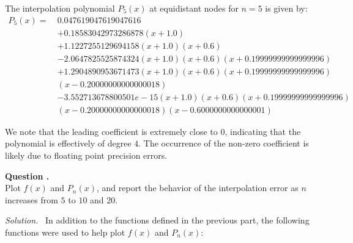 \documentclass[12pt]{article}
\newcounter{question}
\newcounter{subquest}
\newcommand{\subquestion}{
    \stepcounter{subquest} 
    \vspace{.5em}
    \textbf{\large Question \thequestion.\thesubquest}
    \vspace{.25em}\ \\}
\newcommand{\solution}
    {\par\vspace{0.5em}\noindent\emph{Solution.}\ }
    {\par\vspace{1em}}
\begin{document}
The interpolation polynomial $P_5(x)$ at equidistant nodes for $n=5$ is given by:
\begin{align*}
    P_{5}(x) = \ & 0.047619047619047616 \\
        &+ 0.18583042973286878(x + 1.0) \\
        &+ 1.1227255129694158(x + 1.0)(x + 0.6) \\
        &- 2.0647825525874324(x + 1.0)(x + 0.6)(x + 0.19999999999999996) \\
        &+ 1.2904890953671473(x + 1.0)(x + 0.6)(x + 0.19999999999999996)\\
        &(x - 0.20000000000000018) \\
        &- 3.552713678800501e-15(x + 1.0)(x + 0.6)(x + 0.19999999999999996)\\
        &(x - 0.20000000000000018)(x - 0.6000000000000001)
\end{align*}

We note that the leading coefficient is extremely close to $0$, indicating that the polynomial is effectively of degree $4$. The occurrence of the non-zero coefficient is likely due to floating point precision errors.

\newpage
\subquestion
Plot $f(x)$ and $P_n(x)$, and report the behavior of the interpolation error as $n$ increases from $5$ to $10$ and $20$.

\solution 
In addition to the functions defined in the previous part, the following functions were used to help plot $f(x)$ and $P_n(x)$:
\end{document}

